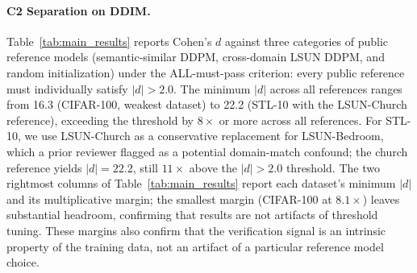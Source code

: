 \documentclass{article}
\begin{document}
\paragraph{C2 Separation on DDIM.}
Table~\ref{tab:main_results} reports Cohen's $d$ against three 
categories of public reference models (semantic-similar DDPM, 
cross-domain LSUN DDPM, and random initialization) under the 
ALL-must-pass criterion: every public reference must individually 
satisfy $|d| > 2.0$. The minimum $|d|$ across all references ranges 
from 16.3 (CIFAR-100, weakest dataset) to 22.2 (STL-10 with the 
LSUN-Church reference), exceeding the threshold by $8\times$ or 
more across all references. For STL-10, we use LSUN-Church as a 
conservative replacement for LSUN-Bedroom, which a prior reviewer 
flagged as a potential domain-match confound; the church reference 
yields $|d| = 22.2$, still $11\times$ above the $|d| > 2.0$ 
threshold. The two rightmost columns of Table~\ref{tab:main_results} 
report each dataset's minimum $|d|$ and its multiplicative margin; 
the smallest margin (CIFAR-100 at $8.1\times$) leaves substantial 
headroom, confirming that results are not artifacts of threshold 
tuning. These margins also confirm that the verification signal is 
an intrinsic property of the training data, not an artifact of a 
particular reference model choice.
\end{document}
